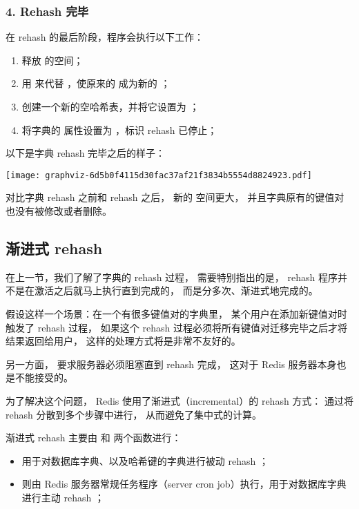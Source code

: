 \documentclass[a4paper,11pt,english]{sphinxmanual}
\begin{document}
\subsubsection{4. Rehash 完毕}
\label{internal-datastruct/dict:id17}
在 rehash 的最后阶段，程序会执行以下工作：
\begin{enumerate}
\item {} 
释放  的空间；

\item {} 
用  来代替  ，使原来的  成为新的  ；

\item {} 
创建一个新的空哈希表，并将它设置为  ；

\item {} 
将字典的  属性设置为  ，标识 rehash 已停止；

\end{enumerate}

以下是字典 rehash 完毕之后的样子：

\texttt{[image: graphviz-6d5b0f4115d30fac37af21f3834b5554d8824923.pdf]}

对比字典 rehash 之前和 rehash 之后，
新的  空间更大，
并且字典原有的键值对也没有被修改或者删除。


\subsection{渐进式 rehash}
\label{internal-datastruct/dict:id18}
在上一节，我们了解了字典的 rehash 过程，
需要特别指出的是， rehash 程序并不是在激活之后就马上执行直到完成的，
而是分多次、渐进式地完成的。

假设这样一个场景：在一个有很多键值对的字典里，
某个用户在添加新键值对时触发了 rehash 过程，
如果这个 rehash 过程必须将所有键值对迁移完毕之后才将结果返回给用户，
这样的处理方式将是非常不友好的。

另一方面，
要求服务器必须阻塞直到 rehash 完成，
这对于 Redis 服务器本身也是不能接受的。

为了解决这个问题，
Redis 使用了渐进式（incremental）的 rehash 方式：
通过将 rehash 分散到多个步骤中进行，
从而避免了集中式的计算。

渐进式 rehash 主要由  和  两个函数进行：
\begin{itemize}
\item {} 
 用于对数据库字典、以及哈希键的字典进行被动 rehash ；

\item {} 
 则由 Redis 服务器常规任务程序（server cron job）执行，用于对数据库字典进行主动 rehash ；

\end{itemize}
\end{document}
